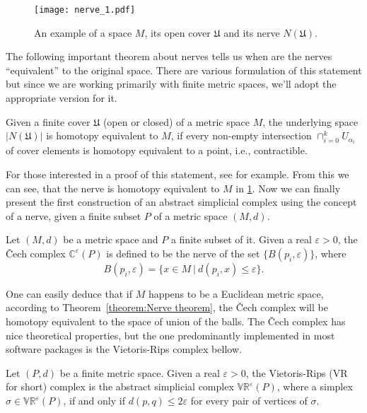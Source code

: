 \begin{figure}[h!]
  \centering
  \texttt{[image: nerve\_1.pdf]}
  \caption{An example of a space $M$, its open cover $\mathfrak{U}$ and its nerve $N(\mathfrak{U})$.}
  \label{fig:nerve_1}
\end{figure}

The following important theorem about nerves tells us when are the nerves ``equivalent'' to the original space. There are various formulation of this statement but since we are working primarily with finite metric spaces, we'll adopt the appropriate version for it.

\begin{theorem}
  Given a finite cover $\mathfrak{U}$ (open or closed) of a metric space $M$, the underlying space $|N(\mathfrak{U})|$ is homotopy equivalent to $M$, if every non-empty intersection $\cap_{i=0}^{k}U_{\alpha_{i}}$ of cover elements is homotopy equivalent to a point, i.e., contractible.
  \label{theorem:Nerve theorem}
\end{theorem}

For those interested in a proof of this statement, see \cite{Borsuk1948OnTI} for example. From this we can see, that the nerve is homotopy equivalent to $M$ in \ref{fig:nerve_1}. Now we can finally present the first construction of an abstract simplicial complex using the concept of a nerve, given a finite subset $P$ of a metric space $(M,d)$.

\begin{definition}
  Let $(M,d)$ be a metric space and $P$ a finite subset of it. Given a real $\varepsilon > 0$, the Čech complex $\mathbb{C}^{\varepsilon}(P)$ is defined to be the nerve of the set $\{B(p_{i},\varepsilon)\}$, where
  \begin{equation*}
    B(p_{i},\varepsilon) = \{x \in M \: \vert \: d(p_{i},x) \leq \varepsilon \}.
  \end{equation*}
\end{definition}

One can easily deduce that if $M$ happens to be a Euclidean metric space, according to Theorem~\ref{theorem:Nerve theorem}, the Čech complex will be homotopy equivalent to the space of union of the balls. The Čech complex has nice theoretical properties, but the one predominantly implemented in most software packages is the Vietoris-Rips complex bellow.

\begin{definition}
  Let $(P,d)$ be a finite metric space. Given a real $\varepsilon>0$, the Vietoris-Rips (VR for short) complex is the abstract simplicial complex $\mathbb{VR}^{\varepsilon}(P)$, where a simplex $\sigma \in \mathbb{VR}^{\varepsilon}(P)$, if and only if $d(p,q) \leq 2\varepsilon$ for every pair of vertices of $\sigma$.
\end{definition}

